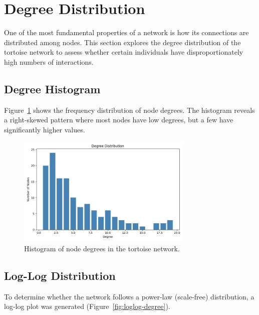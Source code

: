 \documentclass[12pt]{report}
\begin{document}
\chapter*{Degree Distribution}

One of the most fundamental properties of a network is how its connections are distributed among nodes. This section explores the degree distribution of the tortoise network to assess whether certain individuals have disproportionately high numbers of interactions.

\section*{Degree Histogram}

Figure~\ref{fig:degree-histogram} shows the frequency distribution of node degrees. The histogram reveals a right-skewed pattern where most nodes have low degrees, but a few have significantly higher values.

\begin{figure}[h!]
    \centering
    \includegraphics[width=0.75\textwidth]{Images/Degree Histogram.png}
    \caption{Histogram of node degrees in the tortoise network.}
    \label{fig:degree-histogram}
\end{figure}

\section*{Log-Log Distribution}

To determine whether the network follows a power-law (scale-free) distribution, a log-log plot was generated (Figure~\ref{fig:loglog-degree}).
\end{document}
